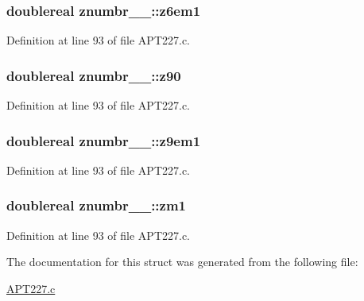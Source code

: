 \subsubsection[{\texorpdfstring{z6em1}{z6em1}}]{\setlength{\rightskip}{0pt plus 5cm}doublereal znumbr\+\_\+\_\+\+::z6em1}\hypertarget{structznumbr__1___a6fe1518e8616aaade951af3080e07086}{}\label{structznumbr__1___a6fe1518e8616aaade951af3080e07086}


Definition at line 93 of file A\+P\+T227.\+c.

\subsubsection[{\texorpdfstring{z90}{z90}}]{\setlength{\rightskip}{0pt plus 5cm}doublereal znumbr\+\_\+\_\+\+::z90}\hypertarget{structznumbr__1___a7ee4ceeb04b142d34f799b0e096ccdf9}{}\label{structznumbr__1___a7ee4ceeb04b142d34f799b0e096ccdf9}


Definition at line 93 of file A\+P\+T227.\+c.

\subsubsection[{\texorpdfstring{z9em1}{z9em1}}]{\setlength{\rightskip}{0pt plus 5cm}doublereal znumbr\+\_\+\_\+\+::z9em1}\hypertarget{structznumbr__1___a40528db2b009a5a31b48761b76975eaa}{}\label{structznumbr__1___a40528db2b009a5a31b48761b76975eaa}


Definition at line 93 of file A\+P\+T227.\+c.

\subsubsection[{\texorpdfstring{zm1}{zm1}}]{\setlength{\rightskip}{0pt plus 5cm}doublereal znumbr\+\_\+\_\+\+::zm1}\hypertarget{structznumbr__1___a1f6fbbb0ee33439c7ad18df0c20c9d80}{}\label{structznumbr__1___a1f6fbbb0ee33439c7ad18df0c20c9d80}


Definition at line 93 of file A\+P\+T227.\+c.



The documentation for this struct was generated from the following file\+:\begin{DoxyCompactItemize}
\item 
\hyperlink{APT227_8c}{A\+P\+T227.\+c}\end{DoxyCompactItemize}
